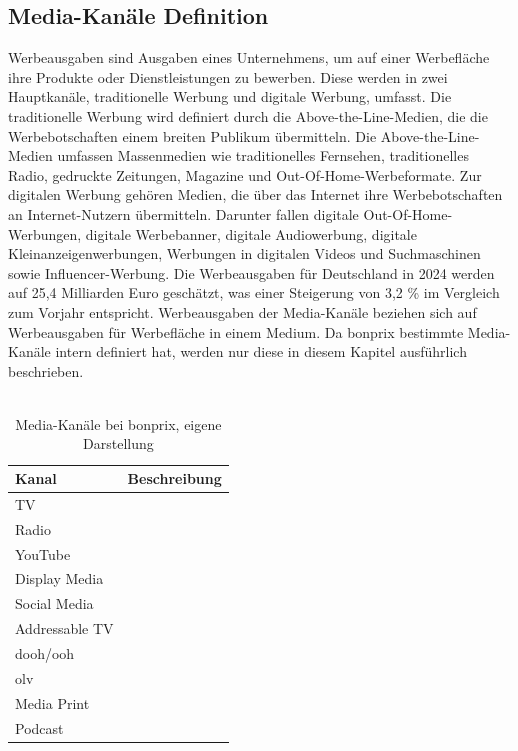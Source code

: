 \subsection{Media-Kanäle Definition}
\label{Media-KanäleDefinition}
Werbeausgaben sind Ausgaben eines Unternehmens, um auf einer Werbefläche ihre Produkte oder Dienstleistungen zu bewerben. Diese werden in zwei Hauptkanäle, traditionelle Werbung und digitale Werbung, umfasst. Die traditionelle Werbung wird definiert durch die Above-the-Line-Medien, die die Werbebotschaften einem breiten Publikum übermitteln. Die Above-the-Line-Medien umfassen Massenmedien wie traditionelles Fernsehen, traditionelles Radio, gedruckte Zeitungen, Magazine und Out-Of-Home-Werbeformate. Zur digitalen Werbung gehören Medien, die über das Internet ihre Werbebotschaften an Internet-Nutzern übermitteln. Darunter fallen digitale Out-Of-Home-Werbungen, digitale Werbebanner, digitale Audiowerbung, digitale Kleinanzeigenwerbungen, Werbungen in digitalen Videos und Suchmaschinen sowie Influencer-Werbung. Die Werbeausgaben für Deutschland in 2024 werden auf 25,4 Milliarden Euro geschätzt, was einer Steigerung von 3,2 \% im Vergleich zum Vorjahr entspricht\cite{statista_werbung}. Werbeausgaben der Media-Kanäle beziehen sich auf Werbeausgaben für Werbefläche in einem Medium. Da bonprix bestimmte Media-Kanäle intern definiert hat, werden nur diese in diesem Kapitel ausführlich beschrieben. \\\\
\begin{table}[h!]
    \centering
    \begin{tabular}{|l|p{10cm}|}
        \hline
        \textbf{Kanal} & \textbf{Beschreibung} \\ \hline
        TV & \\ \hline
        Radio & \\ \hline
        YouTube & \\ \hline
        Display Media & \\ \hline
        Social Media & \\ \hline
        Addressable TV & \\ \hline
        \ac{dooh}/\ac{ooh} & \\ \hline
        \ac{olv} & \\ \hline
        Media Print & \\ \hline
        Podcast & \\ \hline
    \end{tabular}
    \caption{Media-Kanäle bei bonprix, eigene Darstellung}
    \label{tab:mediachannels}
\end{table}

